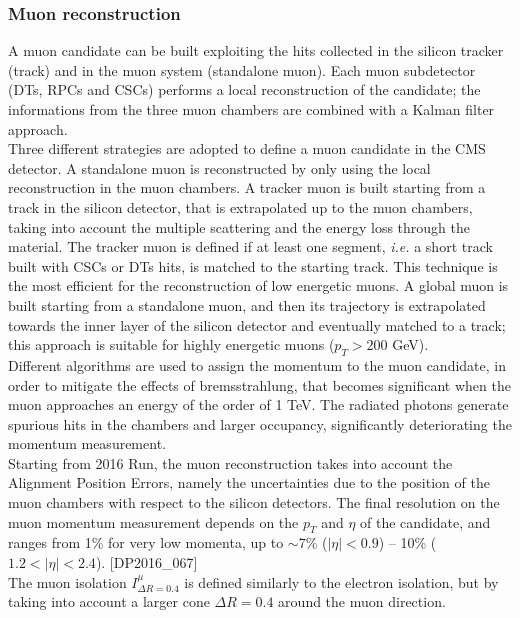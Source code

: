 \subsubsection{Muon reconstruction}
A muon candidate can be built exploiting the hits collected in the silicon tracker (track) and in the muon system (standalone muon). Each muon subdetector (DTs, RPCs and CSCs) performs a local reconstruction of the candidate; the informations from the three muon chambers are combined with a Kalman filter approach.\\
Three different strategies are adopted to define a muon candidate in the CMS detector. A standalone muon is reconstructed by only using the local reconstruction in the muon chambers. A tracker muon is built starting from a track in the silicon detector, that is extrapolated up to the muon chambers, taking into account the multiple scattering and the energy loss through the material. The tracker muon is defined if at least one segment, \textit{i.e.} a short track built with CSCs or DTs hits, is matched to the starting track. This technique is the most efficient for the reconstruction of low energetic muons. A global muon is built starting from a standalone muon, and then its trajectory is extrapolated towards the inner layer of the silicon detector and eventually matched to a track; this approach is suitable for highly energetic muons ($p_T>200$ GeV).\\
Different algorithms are used to assign the momentum to the muon candidate, in order to mitigate the effects of bremsstrahlung, that becomes significant when the muon approaches an energy of the order of 1 TeV. The radiated photons generate spurious hits in the chambers and larger occupancy, significantly deteriorating the momentum measurement.\\
Starting from 2016 Run, the muon reconstruction takes into account the Alignment Position Errors, namely the uncertainties due to the position of the muon chambers with respect to the silicon detectors. The final resolution on the muon momentum measurement depends on the $p_T$ and $\eta$ of the candidate, and ranges from 1\% for very low momenta, up to $\sim$7\% ($|\eta|<0.9$) -- 10\% ($1.2 < |\eta| < 2.4$). [DP2016\_067]\\
The muon isolation $I_{\Delta R = 0.4}^{\mu}$ is defined similarly to the electron isolation, but by taking into account a larger cone $\Delta R = 0.4$ around the muon direction.

